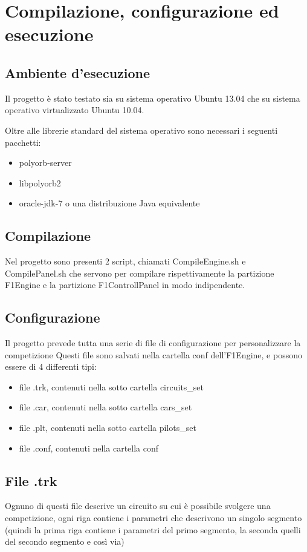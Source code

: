 \documentclass[a4paper,11pt, twoside]{book}
\begin{document}
  \chapter{Compilazione, configurazione ed esecuzione}
    \section{Ambiente d'esecuzione}
      Il progetto è stato testato sia su sistema operativo Ubuntu 13.04 che su sistema operativo virtualizzato Ubuntu 10.04.
      
      Oltre alle librerie standard del sistema operativo sono necessari i seguenti pacchetti:
      \begin{itemize}
        \item polyorb-server
	\item libpolyorb2
	\item oracle-jdk-7 o una distribuzione Java equivalente
      \end{itemize}

    \section{Compilazione}
      Nel progetto sono presenti 2 script, chiamati CompileEngine.sh e CompilePanel.sh
      che servono per compilare rispettivamente la partizione F1Engine e la partizione F1ControllPanel
      in modo indipendente.
      
    \section{Configurazione}
      Il progetto prevede tutta una serie di file di configurazione per personalizzare la competizione
      Questi file sono salvati nella cartella conf dell'F1Engine, e possono essere di 4 differenti tipi:
      
      \begin{itemize}
	\item file .trk, contenuti nella sotto cartella circuits\_set 
	\item file .car, contenuti nella sotto cartella cars\_set
	\item file .plt, contenuti nella sotto cartella pilots\_set
	\item file .conf, contenuti nella cartella conf
      \end{itemize}
      
      \section{File .trk}
	Ognuno di questi file descrive un circuito su cui è possibile svolgere una competizione, ogni riga contiene i parametri
	che descrivono un singolo segmento (quindi la prima riga contiene i parametri del primo segmento, la seconda
	quelli del secondo segmento e così via)
	
\end{document}
